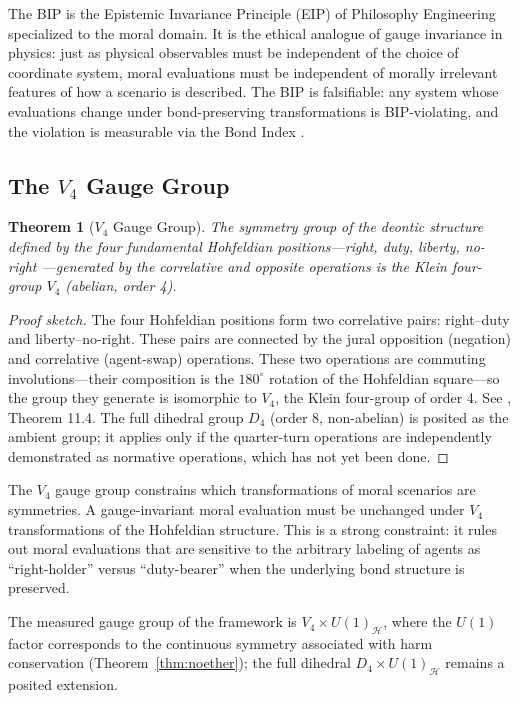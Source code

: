 \documentclass[12pt]{article}
\newtheorem{theorem}{Theorem}[section]
\theoremstyle{definition}
\theoremstyle{remark}
\newcommand{\harm}{\mathcal{H}}
\begin{document}
The BIP is the Epistemic Invariance Principle (EIP) of Philosophy Engineering \citep{anon2025c} specialized to the moral domain. It is the ethical analogue of gauge invariance in physics: just as physical observables must be independent of the choice of coordinate system, moral evaluations must be independent of morally irrelevant features of how a scenario is described. The BIP is falsifiable: any system whose evaluations change under bond-preserving transformations is BIP-violating, and the violation is measurable via the Bond Index \citep{anon2026d}.

\subsection{The $V_4$ Gauge Group}

\begin{theorem}[$V_4$ Gauge Group]
\label{thm:d4}
The symmetry group of the deontic structure defined by the four fundamental Hohfeldian positions---right, duty, liberty, no-right \citep{hohfeld1913}---generated by the correlative and opposite operations is the Klein four-group $V_4$ (abelian, order 4).
\end{theorem}

\begin{proof}[Proof sketch]
The four Hohfeldian positions form two correlative pairs: right--duty and liberty--no-right. These pairs are connected by the jural opposition (negation) and correlative (agent-swap) operations. These two operations are commuting involutions---their composition is the $180^\circ$ rotation of the Hohfeldian square---so the group they generate is isomorphic to $V_4$, the Klein four-group of order 4. See \citet{anon2026a}, Theorem 11.4. The full dihedral group $D_4$ (order 8, non-abelian) is posited as the ambient group; it applies only if the quarter-turn operations are independently demonstrated as normative operations, which has not yet been done.
\end{proof}

The $V_4$ gauge group constrains which transformations of moral scenarios are symmetries. A gauge-invariant moral evaluation must be unchanged under $V_4$ transformations of the Hohfeldian structure. This is a strong constraint: it rules out moral evaluations that are sensitive to the arbitrary labeling of agents as ``right-holder'' versus ``duty-bearer'' when the underlying bond structure is preserved.

The measured gauge group of the framework is $V_4 \times U(1)_\harm$, where the $U(1)$ factor corresponds to the continuous symmetry associated with harm conservation (Theorem~\ref{thm:noether}); the full dihedral $D_4 \times U(1)_\harm$ remains a posited extension.
\end{document}

